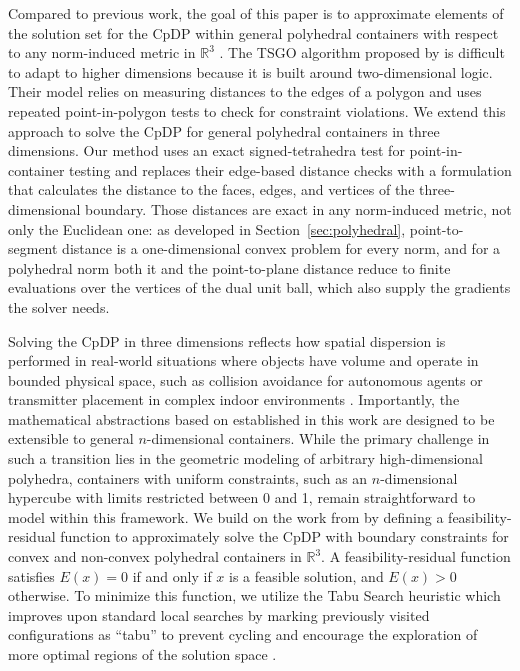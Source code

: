\documentclass[preprint,12pt]{elsarticle}
\theoremstyle{remark}
\def \R {\mathbb{R}}
\begin{document}
Compared to previous work, the goal of this paper is to approximate elements of
the solution set for the CpDP within general polyhedral containers with respect
to any norm-induced metric in $\mathbb{R}^3$ \cite{lai2024}. The TSGO algorithm
proposed by \citet{lai2024} is difficult to adapt to higher dimensions because
it is built around two-dimensional logic. Their model relies on measuring
distances to the edges of a polygon and uses repeated point-in-polygon tests to
check for constraint violations. We extend this approach to solve the CpDP for
general polyhedral containers in three dimensions. Our method uses an exact
signed-tetrahedra test for point-in-container testing and replaces their
edge-based distance checks with a formulation that calculates the distance to
the faces, edges, and vertices of the three-dimensional boundary. Those
distances are exact in any norm-induced metric, not only the Euclidean one: as
developed in Section~\ref{sec:polyhedral}, point-to-segment distance is a
one-dimensional convex problem for every norm, and for a polyhedral norm both it
and the point-to-plane distance reduce to finite evaluations over the vertices
of the dual unit ball, which also supply the gradients the solver needs.

Solving the CpDP in three dimensions reflects how spatial dispersion is
performed in real-world situations where objects have volume and operate in
bounded physical space, such as collision avoidance for autonomous agents
\cite{abdulghafoor2021} or transmitter placement in complex indoor environments
\cite{loganathan2024}. Importantly, the mathematical abstractions based on
\citep{lai2024} established in this work are designed to be extensible to
general $n$-dimensional containers. While the primary challenge in such a
transition lies in the geometric modeling of arbitrary high-dimensional
polyhedra, containers with uniform constraints, such as an $n$-dimensional
hypercube with limits restricted between 0 and 1, remain straightforward to
model within this framework. We build on the work from \citet{lai2024} by
defining a feasibility-residual function to approximately solve the CpDP with
boundary constraints for convex and non-convex polyhedral containers in $\R^3$.
A feasibility-residual function satisfies $E(x) = 0$ if and only if $x$ is a
feasible solution, and $E(x) > 0$ otherwise. To minimize this function, we
utilize the Tabu Search heuristic \cite{glover1997} which improves upon standard
local searches by marking previously visited configurations as ``tabu'' to
prevent cycling and encourage the exploration of more optimal regions of the
solution space \cite{lai2024}.
\end{document}
